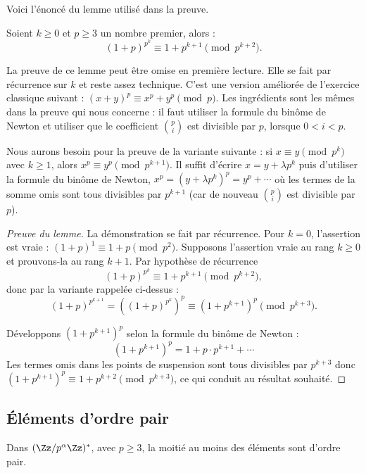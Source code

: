 \documentclass[11pt,class=report,crop=false]{standalone}
\begin{document}
Voici l'énoncé du lemme utilisé dans la preuve.
\begin{lemme}
Soient $k\ge0$ et $p\ge3$ un nombre premier, alors :
$$(1+p)^{p^{k}} \equiv 1 + p^{k+1} \pmod{p^{k+2}}.$$ 
\end{lemme}


La preuve de ce lemme peut être omise en première lecture. Elle se fait par récurrence sur $k$ et reste assez technique.
C'est une version améliorée de l'exercice classique suivant : $(x+y)^p \equiv x^p + y^p \pmod{p}$. Les ingrédients sont les mêmes dans la preuve qui nous concerne : il faut utiliser la formule du binôme de Newton et utiliser que le coefficient $\binom{p}{i}$ est divisible par $p$, lorsque $0<i<p$.

Nous aurons besoin pour la preuve de la variante suivante : 
si $x \equiv y \pmod{p^k}$ avec $k\ge1$, alors $x^p \equiv y^p \pmod{p^{k+1}}$.
Il suffit d'écrire $x = y + \lambda p^k$ puis d'utiliser la formule du binôme de Newton, $x^p = (y+\lambda p^k)^p = y^p + \cdots$ où les termes de la somme omis sont tous divisibles par $p^{k+1}$ (car de nouveau $\binom{p}{i}$ est divisible par $p$).

\begin{proof}[Preuve du lemme]
La démonstration se fait par récurrence.
Pour $k=0$, l'assertion est vraie : $(1+p)^1 \equiv 1+p \pmod{p^2}$.
Supposons l'assertion vraie au rang $k\ge0$ et prouvons-la au rang $k+1$.
Par hypothèse de récurrence 
$$(1+p)^{p^{k}} \equiv 1 + p^{k+1} \pmod{p^{k+2}},$$ 
donc par la variante rappelée ci-dessus :
$$(1+p)^{p^{k+1}} = \left((1+p)^{p^{k}}\right)^p \equiv \left(1 + p^{k+1}\right)^p  \pmod{p^{k+3}}.$$ 

Développons $\left(1 + p^{k+1}\right)^p$ selon la formule du binôme de Newton :
$$\left(1 + p^{k+1}\right)^p = 1 + p\cdot p^{k+1} + \cdots$$
Les termes omis dans les points de suspension sont tous divisibles par $p^{k+3}$ donc $\left(1 + p^{k+1}\right)^p \equiv 1 + p^{k+2} \pmod{p^{k+3}}$, ce qui conduit au résultat souhaité.
\end{proof}


\subsection{\'Eléments d'ordre pair}

\begin{proposition}
\label{prop:ordrezpalpha}
Dans $(\Zz/p^\alpha\Zz)^*$, avec $p\ge3$, la moitié au moins des éléments sont d'ordre pair.

\end{proposition}
\end{document}
